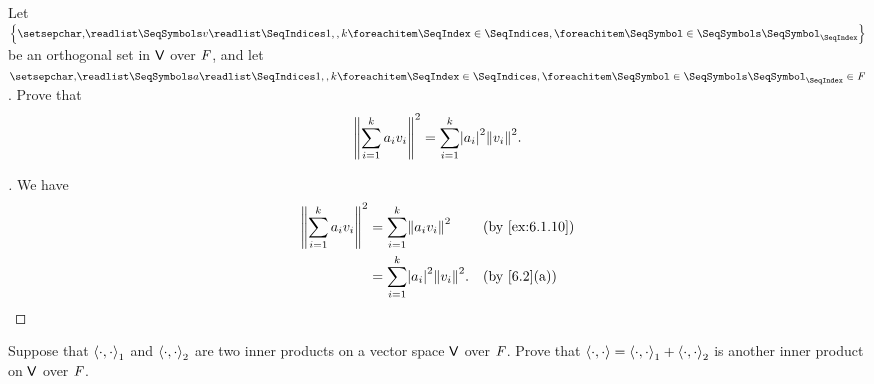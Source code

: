 \begin{ex}\label{ex:6.1.12}
  Let \(\set{\seq{v}{1,,k}}\) be an orthogonal set in \(\mathsf{V}\) over \(\mathit{F}\), and let \(\seq{a}{1,,k} \in \F\).
  Prove that
  \[
    \norm{\sum_{i = 1}^k a_i v_i}^2 = \sum_{i = 1}^k \abs{a_i}^2 \norm{v_i}^2.
  \]
\end{ex}

\begin{proof}[]
  We have
  \begin{align*}
    \norm{\sum_{i = 1}^k a_i v_i}^2 & = \sum_{i = 1}^k \norm{a_i v_i}^2          &  & \text{(by \cref{ex:6.1.10})} \\
                                    & = \sum_{i = 1}^k \abs{a_i}^2 \norm{v_i}^2. &  & \text{(by \cref{6.2}(a))}
  \end{align*}
\end{proof}

\begin{ex}\label{ex:6.1.13}
  Suppose that \(\left\langle\cdot, \cdot\right\rangle_1\) and \(\left\langle\cdot, \cdot\right\rangle_2\) are two inner products on a vector space \(\mathsf{V}\) over \(\mathit{F}\).
  Prove that \(\left\langle\cdot, \cdot\right\rangle = \left\langle\cdot, \cdot\right\rangle_1 + \left\langle\cdot, \cdot\right\rangle_2\) is another inner product on \(\mathsf{V}\) over \(\mathit{F}\).
\end{ex}

